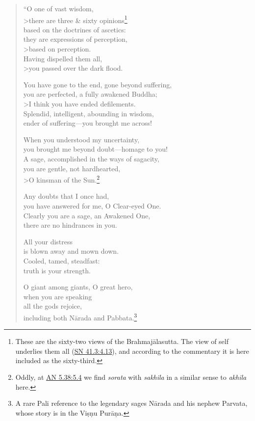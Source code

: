 \documentclass[12pt,openany]{book}%
\begin{document}
\begin{verse}%
“O one of vast wisdom, \\>there are three \& sixty opinions\footnote{These are the sixty-two views of the \textsanskrit{Brahmajālasutta}. The view of self underlies them all (\href{https://suttacentral.net/sn41.3/en/sujato\#4.13}{SN 41.3:4.13}), and according to the commentary it is here included as the sixty-third. } \\
based on the doctrines of ascetics: \\
they are expressions of perception, \\>based on perception. \\
Having dispelled them all, \\>you passed over the dark flood. 

You have gone to the end, gone beyond suffering, \\
you are perfected, a fully awakened Buddha; \\>I think you have ended defilements. \\
Splendid, intelligent, abounding in wisdom, \\
ender of suffering—you brought me across! 

When you understood my uncertainty, \\
you brought me beyond doubt—homage to you! \\
A sage, accomplished in the ways of sagacity, \\
you are gentle, not hardhearted, \\>O kinsman of the Sun.\footnote{Oddly, at \href{https://suttacentral.net/an5.38/en/sujato\#5.4}{AN 5.38:5.4} we find \textit{sorata} with \textit{sakhila} in a similar sense to \textit{akhila} here. } 

Any doubts that I once had, \\
you have answered for me, O Clear-eyed One. \\
Clearly you are a sage, an Awakened One, \\
there are no hindrances in you. 

All your distress \\
is blown away and mown down. \\
Cooled, tamed, steadfast: \\
truth is your strength. 

O giant among giants, O great hero, \\
when you are speaking \\
all the gods rejoice, \\
including both \textsanskrit{Nārada} and Pabbata.\footnote{A rare Pali reference to the legendary sages \textsanskrit{Nārada} and his nephew Parvata, whose story is in the \textsanskrit{Viṣṇu} \textsanskrit{Purāṇa}. } 


\end{verse}
\end{document}
